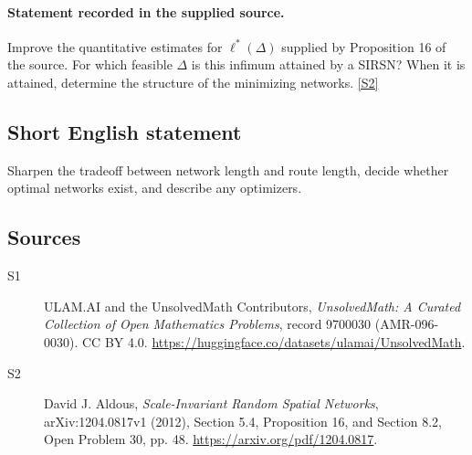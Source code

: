\documentclass[11pt]{article}
\newcommand{\sref}[2]{\hyperlink{source:#1:#2}{[S#2]}}
\begin{document}
\paragraph{Statement recorded in the supplied source.}
Improve the quantitative estimates for $\ell^*(\Delta)$ supplied by Proposition 16 of the source. For which feasible $\Delta$ is this infimum attained by a SIRSN? When it is attained, determine the structure of the minimizing networks. \sref{9700030}{2}
\subsection{Short English statement}
Sharpen the tradeoff between network length and route length, decide whether optimal networks exist, and describe any optimizers.
\subsection{Sources}
\begin{description}
\item[\hypertarget{source:9700030:1}{S1}] ULAM.AI and the UnsolvedMath Contributors, \emph{UnsolvedMath: A Curated Collection of Open Mathematics Problems}, record 9700030 (AMR-096-0030). CC BY 4.0. \url{https://huggingface.co/datasets/ulamai/UnsolvedMath}.
\item[\hypertarget{source:9700030:2}{S2}] David J. Aldous, \emph{Scale-Invariant Random Spatial Networks}, arXiv:1204.0817v1 (2012), Section 5.4, Proposition 16, and Section 8.2, Open Problem 30, pp. 48. \url{https://arxiv.org/pdf/1204.0817}.
\end{description}
\label{end:9700030}
\end{document}
